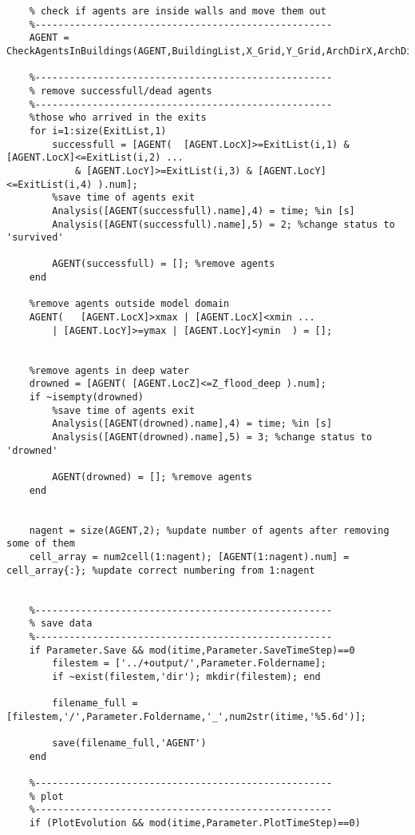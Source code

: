 \begin{lstlisting}[breaklines]
    %----------------------------------------------------
    % check if agents are inside walls and move them out
    %----------------------------------------------------
    AGENT = CheckAgentsInBuildings(AGENT,BuildingList,X_Grid,Y_Grid,ArchDirX,ArchDirY,ArchD);

    %----------------------------------------------------
    % remove successfull/dead agents
    %----------------------------------------------------
    %those who arrived in the exits
    for i=1:size(ExitList,1)
        successfull = [AGENT(  [AGENT.LocX]>=ExitList(i,1) & [AGENT.LocX]<=ExitList(i,2) ...
            & [AGENT.LocY]>=ExitList(i,3) & [AGENT.LocY]<=ExitList(i,4) ).num];
        %save time of agents exit
        Analysis([AGENT(successfull).name],4) = time; %in [s]
        Analysis([AGENT(successfull).name],5) = 2; %change status to 'survived'

        AGENT(successfull) = []; %remove agents
    end

    %remove agents outside model domain
    AGENT(   [AGENT.LocX]>xmax | [AGENT.LocX]<xmin ...
        | [AGENT.LocY]>=ymax | [AGENT.LocY]<ymin  ) = [];


    %remove agents in deep water
    drowned = [AGENT( [AGENT.LocZ]<=Z_flood_deep ).num];
    if ~isempty(drowned)
        %save time of agents exit
        Analysis([AGENT(drowned).name],4) = time; %in [s]
        Analysis([AGENT(drowned).name],5) = 3; %change status to 'drowned'

        AGENT(drowned) = []; %remove agents
    end


    nagent = size(AGENT,2); %update number of agents after removing some of them
    cell_array = num2cell(1:nagent); [AGENT(1:nagent).num] = cell_array{:}; %update correct numbering from 1:nagent


    %----------------------------------------------------
    % save data
    %----------------------------------------------------
    if Parameter.Save && mod(itime,Parameter.SaveTimeStep)==0
        filestem = ['../+output/',Parameter.Foldername];
        if ~exist(filestem,'dir'); mkdir(filestem); end

        filename_full = [filestem,'/',Parameter.Foldername,'_',num2str(itime,'%5.6d')];

        save(filename_full,'AGENT')
    end

    %----------------------------------------------------
    % plot
    %----------------------------------------------------
    if (PlotEvolution && mod(itime,Parameter.PlotTimeStep)==0)


\end{lstlisting}
